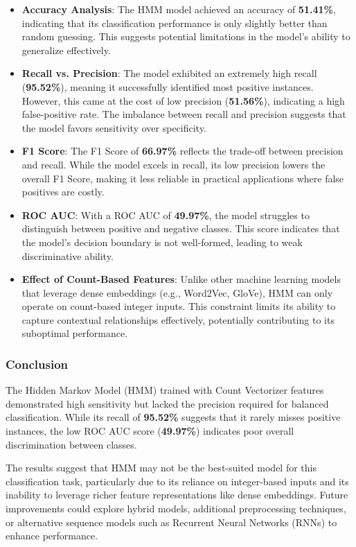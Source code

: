 \begin{itemize}
    \item \textbf{Accuracy Analysis}: The HMM model achieved an accuracy of \textbf{51.41\%}, indicating that its classification performance is only slightly better than random guessing. This suggests potential limitations in the model's ability to generalize effectively.
    
    \item \textbf{Recall vs. Precision}: The model exhibited an extremely high recall (\textbf{95.52\%}), meaning it successfully identified most positive instances. However, this came at the cost of low precision (\textbf{51.56\%}), indicating a high false-positive rate. The imbalance between recall and precision suggests that the model favors sensitivity over specificity.
    
    \item \textbf{F1 Score}: The F1 Score of \textbf{66.97\%} reflects the trade-off between precision and recall. While the model excels in recall, its low precision lowers the overall F1 Score, making it less reliable in practical applications where false positives are costly.
    
    \item \textbf{ROC AUC}: With a ROC AUC of \textbf{49.97\%}, the model struggles to distinguish between positive and negative classes. This score indicates that the model's decision boundary is not well-formed, leading to weak discriminative ability.
    
    \item \textbf{Effect of Count-Based Features}: Unlike other machine learning models that leverage dense embeddings (e.g., Word2Vec, GloVe), HMM can only operate on count-based integer inputs. This constraint limits its ability to capture contextual relationships effectively, potentially contributing to its suboptimal performance.
\end{itemize}

\subsubsection{Conclusion}

The Hidden Markov Model (HMM) trained with Count Vectorizer features demonstrated high sensitivity but lacked the precision required for balanced classification. While its recall of \textbf{95.52\%} suggests that it rarely misses positive instances, the low ROC AUC score (\textbf{49.97\%}) indicates poor overall discrimination between classes. 

The results suggest that HMM may not be the best-suited model for this classification task, particularly due to its reliance on integer-based inputs and its inability to leverage richer feature representations like dense embeddings. Future improvements could explore hybrid models, additional preprocessing techniques, or alternative sequence models such as Recurrent Neural Networks (RNNs) to enhance performance.


